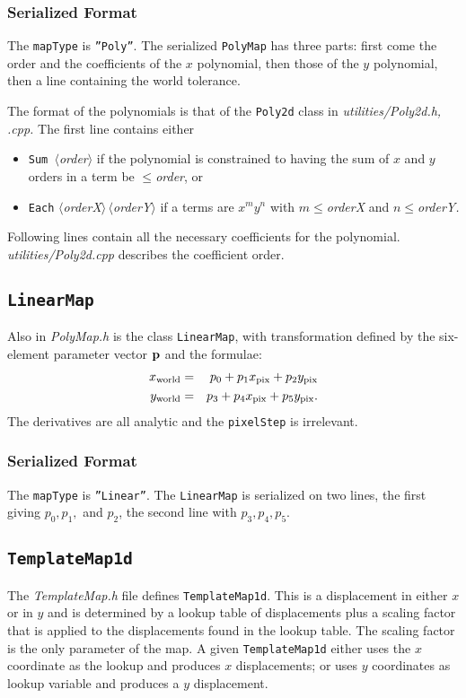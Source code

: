 \documentclass[11pt,preprint,flushrt]{aastex}
\begin{document}
\subsubsection{Serialized Format}
The {\tt mapType} is {\tt ''Poly''}. 
The serialized {\tt PolyMap} has three parts: first come the order and the coefficients of the $x$ polynomial, then those of the $y$ polynomial, then a line containing the world tolerance.  

The format of the polynomials is that of the {\tt Poly2d} class in {\it utilities/Poly2d.h, .cpp.} The first line contains either
\begin{itemize}
\item {\tt Sum }$\langle${\it order}$\rangle$ if the polynomial is constrained to having the sum of $x$ and $y$ orders in a term be $\le${\it order}, or
\item {\tt Each} {\it $\langle$orderX$\rangle\,\langle$orderY$\rangle$}  if a terms are $x^m y^n$ with $m\le${\it orderX} and $n\le${\it orderY.}
\end{itemize}
Following lines contain all the necessary coefficients for the polynomial. {\it utilities/Poly2d.cpp} describes the coefficient order.

\subsection{{\tt LinearMap}}
Also in {\it PolyMap.h} is the class {\tt LinearMap}, with transformation defined by the six-element parameter vector ${\bf p}$ and the formulae:
\begin{eqnarray}
x_{\rm world} & = & p_0 + p_1 x_{\rm pix} + p_2 y_{\rm pix} \\
y_{\rm world} & = & p_3 + p_4 x_{\rm pix} + p_5 y_{\rm pix}.
\end{eqnarray}
The derivatives are all analytic and the {\tt pixelStep} is irrelevant.

\subsubsection{Serialized Format}
The {\tt mapType} is {\tt ''Linear''}.  The {\tt LinearMap} is serialized on two lines, the first giving $p_0, p_1,$ and $p_2$, the second line with $p_3, p_4, p_5.$

\subsection{\tt TemplateMap1d}
The {\it TemplateMap.h} file defines {\tt TemplateMap1d}.  This is a displacement in either $x$ or in $y$ and is determined by a lookup table of displacements plus a scaling factor that is applied to the displacements found in the lookup table.  The scaling factor is the only parameter of the map.  A given {\tt TemplateMap1d} either uses the $x$ coordinate as the lookup and produces $x$ displacements; or uses $y$ coordinates as lookup variable and produces a $y$ displacement.
\end{document}
